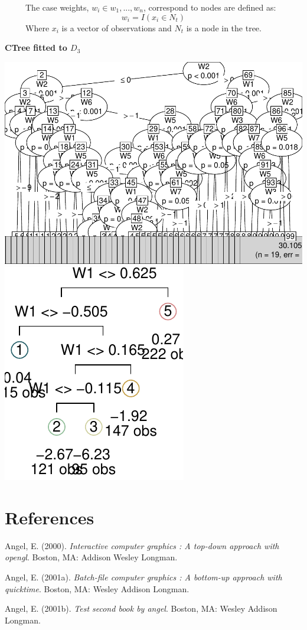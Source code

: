 \documentclass[12pt,twoside]{reedthesis}
\begin{document}
  ~~~~~The case weights, \(w_i \in {w_1,..., w_n}\), correspond to nodes
  are defined as:\[w_i = I(x_i \in {N_t})\] ~~~~~Where \(x_i\) is a vector
  of observations and \(N_t\) is a node in the tree.
  
  \textbf{CTree fitted to \(D_3\)}
  
  \includegraphics{Thesis_files/figure-latex/ctree-1.pdf}
  \includegraphics{Thesis_files/figure-latex/ctree-2.pdf}
  
  \backmatter
  
  \chapter{References}\label{references}
  
  \noindent
  
  \setlength{\parindent}{-0.20in} \setlength{\leftskip}{0.20in}
  \setlength{\parskip}{8pt}
  
  \hypertarget{refs}{}
  \hypertarget{ref-angel2000}{}
  Angel, E. (2000). \emph{Interactive computer graphics : A top-down
  approach with opengl}. Boston, MA: Addison Wesley Longman.
  
  \hypertarget{ref-angel2001}{}
  Angel, E. (2001a). \emph{Batch-file computer graphics : A bottom-up
  approach with quicktime}. Boston, MA: Wesley Addison Longman.
  
  \hypertarget{ref-angel2002a}{}
  Angel, E. (2001b). \emph{Test second book by angel}. Boston, MA: Wesley
  Addison Longman.


\end{document}
